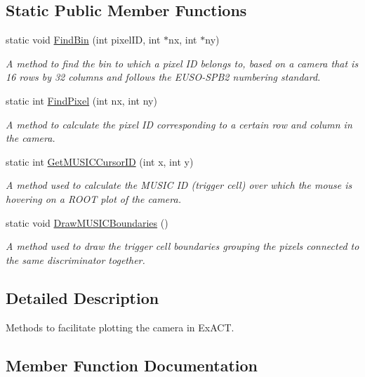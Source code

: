 \subsection*{Static Public Member Functions}
\begin{DoxyCompactItemize}
\item 
static void \hyperlink{classIPlotTools_a75098e1fcab37127a4a855c0833b00e3}{Find\+Bin} (int pixel\+ID, int $\ast$nx, int $\ast$ny)
\begin{DoxyCompactList}\small\item\em A method to find the bin to which a pixel ID belongs to, based on a camera that is 16 rows by 32 columns and follows the E\+U\+S\+O-\/\+S\+P\+B2 numbering standard. \end{DoxyCompactList}\item 
static int \hyperlink{classIPlotTools_a56f33f65542d4f6e82905bef404452ae}{Find\+Pixel} (int nx, int ny)
\begin{DoxyCompactList}\small\item\em A method to calculate the pixel ID corresponding to a certain row and column in the camera. \end{DoxyCompactList}\item 
static int \hyperlink{classIPlotTools_a0e2f7e9cf1a12de048199efadf86088f}{Get\+M\+U\+S\+I\+C\+Cursor\+ID} (int x, int y)
\begin{DoxyCompactList}\small\item\em A method used to calculate the M\+U\+S\+IC ID (trigger cell) over which the mouse is hovering on a R\+O\+OT plot of the camera. \end{DoxyCompactList}\item 
static void \hyperlink{classIPlotTools_a77fc4a8cc4240cf78c1f32876a0267ec}{Draw\+M\+U\+S\+I\+C\+Boundaries} ()
\begin{DoxyCompactList}\small\item\em A method used to draw the trigger cell boundaries grouping the pixels connected to the same discriminator together. \end{DoxyCompactList}\end{DoxyCompactItemize}


\subsection{Detailed Description}
Methods to facilitate plotting the camera in Ex\+A\+CT. 



\subsection{Member Function Documentation}
\mbox{\label{classIPlotTools_a77fc4a8cc4240cf78c1f32876a0267ec}} 
